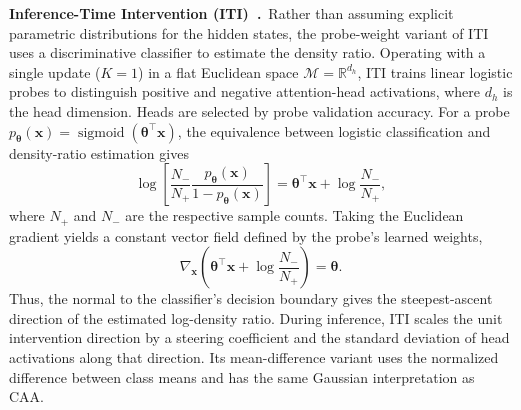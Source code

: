 \noindent\textbf{Inference-Time Intervention (ITI)~\citep{li2023inference}.}~Rather than assuming explicit parametric distributions for the hidden states, the probe-weight variant of ITI uses a discriminative classifier to estimate the density ratio. Operating with a single update ($K=1$) in a flat Euclidean space $\mathcal{M}=\mathbb{R}^{d_h}$, ITI trains linear logistic probes to distinguish positive and negative attention-head activations, where $d_h$ is the head dimension. Heads are selected by probe validation accuracy. For a probe $p_{\boldsymbol{\theta}}(\boldsymbol{x})=\operatorname{sigmoid}(\boldsymbol{\theta}^{\top}\boldsymbol{x})$, the equivalence between logistic classification and density-ratio estimation gives
\[
\log\!\left[\frac{N_-}{N_+}\frac{p_{\boldsymbol{\theta}}(\boldsymbol{x})}{1-p_{\boldsymbol{\theta}}(\boldsymbol{x})}\right]
=\boldsymbol{\theta}^{\top}\boldsymbol{x}+\log\frac{N_-}{N_+},
\]
where $N_+$ and $N_-$ are the respective sample counts. Taking the Euclidean gradient yields a constant vector field defined by the probe's learned weights,
\[
\nabla_{\boldsymbol{x}}\left(\boldsymbol{\theta}^{\top}\boldsymbol{x}+\log\frac{N_-}{N_+}\right)
=\boldsymbol{\theta}.
\]
Thus, the normal to the classifier's decision boundary gives the steepest-ascent direction of the estimated log-density ratio. During inference, ITI scales the unit intervention direction by a steering coefficient and the standard deviation of head activations along that direction. Its mean-difference variant uses the normalized difference between class means and has the same Gaussian interpretation as CAA.

